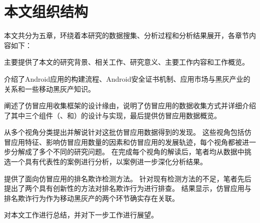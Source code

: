 \section{本文组织结构}
本文共分为五章，环绕着本研究的数据搜集、分析过程和分析结果展开，各章节内容如下：

 主要提供了本文的研究背景、相关工作、研究意义、主要工作内容和工作概览。

 介绍了Android应用的构建流程、Android安全证书机制、应用市场与黑灰产业的关系和一些移动黑灰产知识。

 阐述了仿冒应用收集框架\mytool 的设计缘由，说明了仿冒应用的数据收集方式并详细介绍了其中三个组件（\componentA、\componentB 和\componentC）的设计与实现，最后提供仿冒应用数据概览。

 从多个视角分类提出并解说针对这批仿冒应用数据得到的发现。
这些视角包括仿冒应用特征、影响仿冒应用数量的因素和仿冒应用的发展轨迹，每个视角都被进一步分解成了多个不同的研究问题。
在完成每个视角的解读后，笔者均从数据中挑选一个具有代表性的案例进行分析，以案例进一步深化分析结果。

 提供了面向仿冒应用的排名欺诈检测方法。
针对现有检测方法的不足，笔者先后提出了两个具有创新性的方法对排名欺诈行为进行排查。
结果显示，仿冒应用与排名欺诈行为作为移动黑灰产的两个环节确实存在关联。

 对本文工作进行总结，并对下一步工作进行展望。

